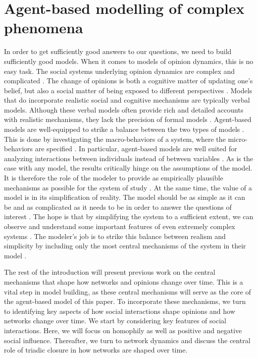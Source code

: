 \documentclass{article}
\begin{document}
\section{Agent-based modelling of complex phenomena}
In order to get sufficiently good answers to our questions, we need to build sufficiently good models. 
When it comes to models of opinion dynamics, this is no easy task. 
The social systems underlying opinion dynamics are complex and complicated \cite{mas2019challenges}. 
The change of opinions is both a cognitive matter of updating one’s belief, but also a social matter of being exposed to different perspectives \cite{flache_models_2017,friedkin_social_1990,spears_social_2021}. 
Models that do incorporate realistic social and cognitive mechanisms are typically verbal models. 
Although these verbal models often provide rich and detailed accounts with realistic mechanisms, they lack the precision of formal models \cite{fogarty_ten_2022,galesic_integrating_2021,smaldino_how_2020}. 
Agent-based models are well-equipped to strike a balance between the two types of models \cite{flache_between_2018,galesic_integrating_2021,epstein1999agent,mas2014cultural}. This is done by investigating the macro-behaviors of a system, where the micro-behaviors are specified \cite{bruch_agent-based_2015,epstein1999agent,flache_between_2018}. In particular, agent-based models are well suited for analyzing interactions between individuals instead of between variables \cite{geschke2019triple}. As is the case with any model, the results critically hinge on the assumptions of the model. It is therefore the role of the modeler to provide as empirically plausible mechanisms as possible for the system of study \cite{crooks2012introduction,epstein1999agent,page2010diversity}. At the same time, the value of a model is in its simplification of reality. The model should be as simple as it can be and as complicated as it needs to be in order to answer the questions of interest \cite{smaldino_how_2020}. The hope is that by simplifying the system to a sufficient extent, we can observe and understand some important features of even extremely complex systems \cite{fogarty_ten_2022,smaldino_how_2020}. The modeler’s job is to strike this balance between realism and simplicity by including only the most central mechanisms of the system in their model \cite{smaldino_models_2016}. 

The rest of the introduction will present previous work on the central mechanisms that shape how networks and opinions change over time. This is a vital step in model building, as these central mechanisms will serve as the core of the agent-based model of this paper. To incorporate these mechanisms, we turn to identifying key aspects of how social interactions shape opinions and how networks change over time. We start by considering key features of social interactions. Here, we will focus on homophily as well as positive and negative social influence. Thereafter, we turn to network dynamics and discuss the central role of triadic closure in how networks are shaped over time.
\end{document}
